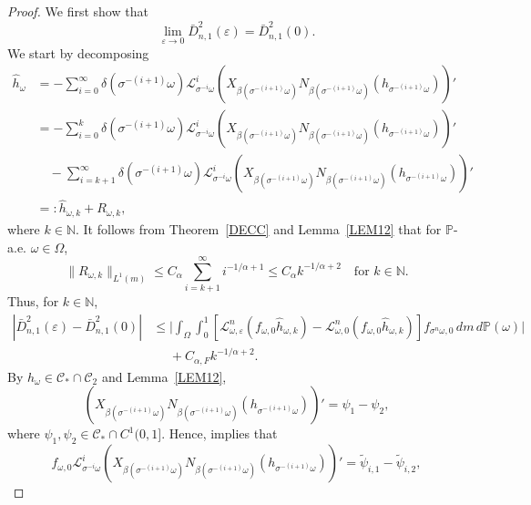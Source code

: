 \documentclass[12pt,reqno,a4paper]{article}
\newcommand{\ve}{\varepsilon}
\newcommand\cL{{\mathcal L}}
\newcommand\bP{{\mathbb P}}
\newcommand\cC{{\mathcal C}}
\begin{document}
\begin{proof}
	We first show that \begin{equation}\label{limit1}\lim_{\ve \to 0} \bar{D}_{n,1}^2(\ve) = \bar{D}_{n,1}^2(0).\end{equation} We start by decomposing
	\begin{align*}
		\hat{h}_\omega &= - \sum_{i=0}^\infty 
		\delta( \sigma^{ - ( i + 1 ) } \omega ) 
		\cL_{ \sigma^{-i} \omega  }^i   ( X_{ \beta( \sigma^{ - ( i + 1) }  \omega ) }  
		N_{\beta( \sigma^{ - ( i + 1) } \omega )}( h_{ \sigma^{-(i+1)} \omega } ))' \\
		&= - \sum_{i=0}^{k} 
		\delta( \sigma^{ - ( i + 1 ) } \omega ) 
		\cL_{ \sigma^{-i} \omega  }^i   ( X_{ \beta( \sigma^{ - ( i + 1) }  \omega ) }  
		N_{\beta( \sigma^{ - ( i + 1) } \omega )}( h_{ \sigma^{-(i+1)} \omega } ))' \\
		&\quad - \sum_{i= k + 1 }^\infty 
		\delta( \sigma^{ - ( i + 1 ) } \omega ) 
		\cL_{ \sigma^{-i} \omega  }^i   ( X_{ \beta( \sigma^{ - ( i + 1) }  \omega ) }  
		N_{\beta( \sigma^{ - ( i + 1) } \omega )}( h_{ \sigma^{-(i+1)} \omega } ))'\\
		&=: \hat{h}_{\omega,k} + R_{\omega, k},
	\end{align*}
	where $k\in \mathbb N$. It follows from Theorem~\ref{DECC} and Lemma~\ref{LEM12} that for $\mathbb P$-a.e. $\omega \in \Omega$, 
	\[
	\|R_{\omega, k}\|_{L^1(m)} \le C_\alpha \sum_{i = k + 1}^\infty i^{ - 1 / \alpha + 1 } 
	\le C_{\alpha} k^{ - 1 / \alpha + 2 }\quad \text{for $k\in \mathbb N$.}
	\]
	Thus, for $k\in \mathbb N$,
	\begin{align*}
		|\bar{D}_{n,1}^2(\ve) - \bar{D}_{n,1}^2(0)|
		&\le \biggl| 
		\int_\Omega \int_0^1 
		[ \cL_{\omega, \ve}^n ( f_{\omega, 0}   \hat{h}_{\omega, k} ) 
		- \cL_{\omega, 0}^n ( f_{\omega, 0}   \hat{h}_{\omega, k} ) ] 
		f_{\sigma^n\omega, 0} \, d m \, d \bP(\omega)
		\biggr| \\
		&\phantom{\le}+ C_{\alpha, F} k^{ - 1 / \alpha + 2}.
	\end{align*}
	By $h_\omega \in \cC_* \cap \cC_2$
	and
	Lemma~\ref{LEM12},
	$$
	( X_{ \beta( \sigma^{ - ( i + 1) }  \omega ) } N_{\beta( \sigma^{ - ( i + 1) } \omega )}( h_{ \sigma^{-(i+1)} \omega } ))' 
	= \psi_1 - \psi_2,
	$$
	where $\psi_1, \psi_2 \in \cC_* \cap C^1(0,1]$. Hence, \cite[Lemma 3.3]{LS} implies that
	$$
	f_{\omega, 0}
	\cL_{\sigma^{-i} \omega }^i ( X_{ \beta( \sigma^{ - ( i + 1) }  \omega ) } N_{\beta( \sigma^{ - ( i + 1) } \omega )}( h_{ \sigma^{-(i+1)} \omega } ))'
	= \tilde{\psi}_{i,1} - \tilde{\psi}_{i,2},
$$
\end{proof}
\end{document}
